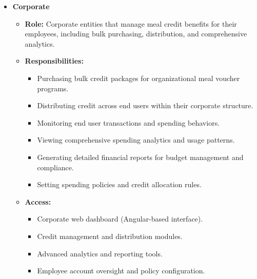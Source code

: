 \begin{itemize}
    \item \textbf{Corporate}
    \begin{itemize}
        \item \textbf{Role:} Corporate entities that manage meal credit benefits for their employees, including bulk purchasing, distribution, and comprehensive analytics.
        \item \textbf{Responsibilities:}
        \begin{itemize}
            \item Purchasing bulk credit packages for organizational meal voucher programs.
            \item Distributing credit across end users within their corporate structure.
            \item Monitoring end user transactions and spending behaviors.
            \item Viewing comprehensive spending analytics and usage patterns.
            \item Generating detailed financial reports for budget management and compliance.
            \item Setting spending policies and credit allocation rules.
        \end{itemize}
        \item \textbf{Access:}
        \begin{itemize}
            \item Corporate web dashboard (Angular-based interface).
            \item Credit management and distribution modules.
            \item Advanced analytics and reporting tools.
            \item Employee account oversight and policy configuration.
        \end{itemize}
    \end{itemize}


\end{itemize}
